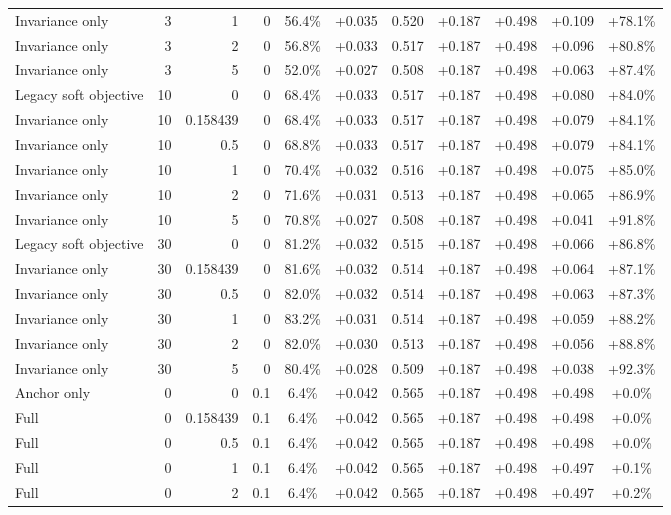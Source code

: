 \begin{table}[htbp]
\begin{tabular}{lrrrccccccc}
Invariance only & 3 & 1 & 0 & 56.4\% & +0.035 & 0.520 & +0.187 & +0.498 & +0.109 & +78.1\% \\
Invariance only & 3 & 2 & 0 & 56.8\% & +0.033 & 0.517 & +0.187 & +0.498 & +0.096 & +80.8\% \\
Invariance only & 3 & 5 & 0 & 52.0\% & +0.027 & 0.508 & +0.187 & +0.498 & +0.063 & +87.4\% \\
Legacy soft objective & 10 & 0 & 0 & 68.4\% & +0.033 & 0.517 & +0.187 & +0.498 & +0.080 & +84.0\% \\
Invariance only & 10 & 0.158439 & 0 & 68.4\% & +0.033 & 0.517 & +0.187 & +0.498 & +0.079 & +84.1\% \\
Invariance only & 10 & 0.5 & 0 & 68.8\% & +0.033 & 0.517 & +0.187 & +0.498 & +0.079 & +84.1\% \\
Invariance only & 10 & 1 & 0 & 70.4\% & +0.032 & 0.516 & +0.187 & +0.498 & +0.075 & +85.0\% \\
Invariance only & 10 & 2 & 0 & 71.6\% & +0.031 & 0.513 & +0.187 & +0.498 & +0.065 & +86.9\% \\
Invariance only & 10 & 5 & 0 & 70.8\% & +0.027 & 0.508 & +0.187 & +0.498 & +0.041 & +91.8\% \\
Legacy soft objective & 30 & 0 & 0 & 81.2\% & +0.032 & 0.515 & +0.187 & +0.498 & +0.066 & +86.8\% \\
Invariance only & 30 & 0.158439 & 0 & 81.6\% & +0.032 & 0.514 & +0.187 & +0.498 & +0.064 & +87.1\% \\
Invariance only & 30 & 0.5 & 0 & 82.0\% & +0.032 & 0.514 & +0.187 & +0.498 & +0.063 & +87.3\% \\
Invariance only & 30 & 1 & 0 & 83.2\% & +0.031 & 0.514 & +0.187 & +0.498 & +0.059 & +88.2\% \\
Invariance only & 30 & 2 & 0 & 82.0\% & +0.030 & 0.513 & +0.187 & +0.498 & +0.056 & +88.8\% \\
Invariance only & 30 & 5 & 0 & 80.4\% & +0.028 & 0.509 & +0.187 & +0.498 & +0.038 & +92.3\% \\
Anchor only & 0 & 0 & 0.1 & 6.4\% & +0.042 & 0.565 & +0.187 & +0.498 & +0.498 & +0.0\% \\
Full & 0 & 0.158439 & 0.1 & 6.4\% & +0.042 & 0.565 & +0.187 & +0.498 & +0.498 & +0.0\% \\
Full & 0 & 0.5 & 0.1 & 6.4\% & +0.042 & 0.565 & +0.187 & +0.498 & +0.498 & +0.0\% \\
Full & 0 & 1 & 0.1 & 6.4\% & +0.042 & 0.565 & +0.187 & +0.498 & +0.497 & +0.1\% \\
Full & 0 & 2 & 0.1 & 6.4\% & +0.042 & 0.565 & +0.187 & +0.498 & +0.497 & +0.2\% \\

\end{tabular}
\end{table}
